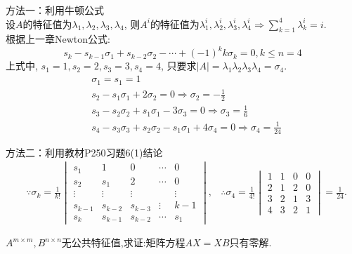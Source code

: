 \begin{solution}
  {\heiti 方法一：利用牛顿公式}\\
  设$A$的特征值为$\lambda_1,\lambda_2,\lambda_3,\lambda_4$,
  则$A^i$的特征值为$\lambda_1^i,\lambda_2^i,\lambda_3^i,\lambda_4^i
  \Longrightarrow \sum\limits^4_{k=1}\lambda_k^i=i$.\\
  根据上一章Newton公式:
  \begin{equation}\label{eq:estimate1}
    s_k-s_{k-1}\sigma_1+s_{k-2}\sigma_2-\cdots+(-1)^kk\sigma_k=0, k \leq n = 4
  \end{equation}
  上式中, $s_1=1, s_2=2, s_3=3, s_4=4$,
  只要求$|A|=\lambda_1\lambda_2\lambda_3\lambda_4=\sigma_4$.
  \begin{align*}
    & \sigma_1 = s_1 = 1\\
    & s_2-s_1\sigma_1+2\sigma_2=0 \Longrightarrow \sigma_2 = -\frac{1}{2}\\
    & s_3-s_2\sigma_2+s_1\sigma_1-3\sigma_3=0 \Longrightarrow
      \sigma_3=\frac{1}{6}\\
    & s_4-s_3\sigma_3+s_2\sigma_2-s_1\sigma_1+4\sigma_4=0 \Longrightarrow
      \sigma_4=\frac{1}{24}
  \end{align*}

  {\heiti 方法二：利用教材P250习题6(1)结论}
  \begin{align*}
  & \because \sigma_k=\frac{1}{k!}
  \begin{vmatrix}
    s_1 & 1 & 0 & \cdots & 0 \\
    s_2 & s_1 & 2 & \cdots & 0 \\
    \vdots & \vdots & \vdots & & \vdots \\
    s_{k-1} & s_{k-2} & s_{k-3} & \vdots & k-1 \\
    s_k & s_{k-1} & s_{k-2} & \cdots & s_1
  \end{vmatrix}, 
  & \therefore \sigma_4=\frac{1}{4!}
  \begin{vmatrix}
    1 & 1 & 0 & 0 \\
    2 & 1 & 2 & 0 \\
    3 & 2 & 1 & 3 \\
    4 & 3 & 2 & 1
  \end{vmatrix}=\frac{1}{24}.
  \end{align*}
\end{solution}
\begin{example}\label{ex:estimate1}
  $A^{m\times m},B^{n\times n}$无公共特征值,求证:矩阵方程$AX=XB$只有零解.
\end{example}

